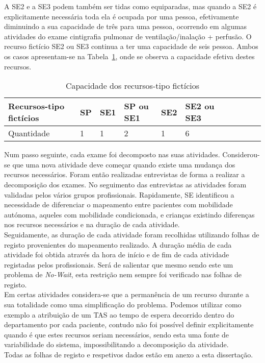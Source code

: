 A SE2 e a SE3 podem também ser tidas como equiparadas, mas quando a SE2 é explicitamente necessária toda ela é ocupada por uma pessoa, efetivamente diminuindo a sua capacidade de três para uma pessoa, ocorrendo em algumas atividades do exame cintigrafia pulmonar de ventilação/inalação + perfusão. O recurso fictício SE2 ou SE3 continua a ter uma capacidade de seis pessoa. Ambos os casos apresentam-se na Tabela~\ref{tab:cap_RFic}, onde se observa a capacidade efetiva destes recursos.\\
\begin{table}[H]
\centering
\caption{Capacidade dos recursos-tipo fictícios}
\label{tab:cap_RFic}
\begin{tabular}{l|llllllllll}
Recursos-tipo fictícios & SP & SE1 & SP ou SE1 & SE2 & SE2 ou SE3\\ \hline
Quantidade              & 1  & 1   & 2         & 1   & 6
\end{tabular}
\end{table}

Num passo seguinte, cada exame foi decomposto nas suas atividades. Considerou-se que uma nova atividade deve começar quando existe uma mudança dos recursos necessários. Foram então realizadas entrevistas de forma a realizar a decomposição dos exames. No seguimento das entrevistas as atividades foram validadas pelos vários grupos profissionais. Rapidamente, SE identificou a necessidade de diferenciar o mapeamento entre pacientes com mobilidade autónoma, aqueles com mobilidade condicionada, e crianças existindo diferenças nos recursos necessários e na duração de cada atividade.\\
Seguidamente, as duração de cada atividade foram recolhidas utilizando folhas de registo provenientes do mapeamento realizado. A duração média de cada atividade foi obtida através da hora de início e de fim de cada atividade registadas pelos profissionais. Será de salientar que mesmo sendo este um problema de \textit{No-Wait}, esta restrição nem sempre foi verificado nas folhas de registo.\\

Em certas atividades considera-se que a permanência de um recurso durante a sua totalidade como uma simplificação do problema. Podemos utilizar como exemplo a atribuição de um TAS ao tempo de espera decorrido dentro do departamento por cada paciente, contudo não foi possível definir explicitamente quando é que estes recursos seriam necessários, sendo esta uma fonte de variabilidade do sistema, impossibilitando a decomposição da atividade.\\ 
Todas as folhas de registo e respetivos dados estão em anexo a esta dissertação.\\

